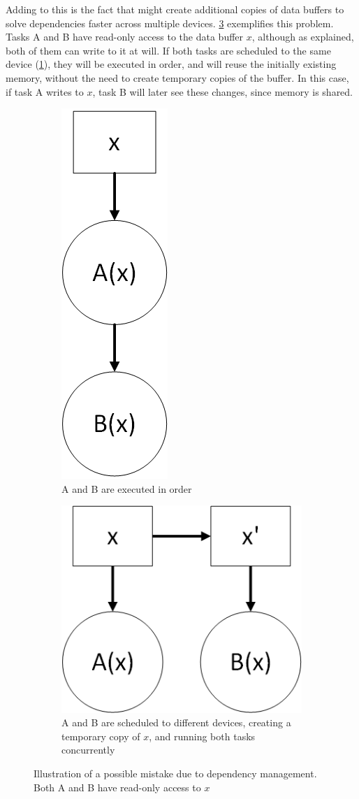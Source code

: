\documentclass[main.tex]{subfiles}
\begin{document}
Adding to this is the fact that \starpu might create additional copies of data buffers to solve dependencies faster across multiple devices. \cref{fig:deps_problem} exemplifies this problem. Tasks A and B have read-only access to the data buffer $x$, although as explained, both of them can write to it at will. If both tasks are scheduled to the same device (\cref{fig:deps_problem:a}), they will be executed in order, and \starpu will reuse the initially existing memory, without the need to create temporary copies of the buffer. In this case, if task A writes to $x$, task B will later see these changes, since memory is shared.


\begin{figure}[!htp]
  \centering
  \begin{subfigure}[b]{.5\textwidth}
    \centering
    \includegraphics[width=0.2\linewidth]{visio/starpu_dep_rw}
    \caption{A and B are executed in order \label{fig:deps_problem:a}}
  \end{subfigure}%
  \begin{subfigure}[b]{.5\textwidth}
    \centering
    \includegraphics[width=0.6\linewidth]{visio/starpu_dep_rw_caveat}
    \caption{A and B are scheduled to different devices, creating a temporary copy of $x$, and running both tasks concurrently \label{fig:deps_problem:b}}
  \end{subfigure}
  \caption{Illustration of a possible mistake due to dependency management. Both A and B have read-only access to $x$ \label{fig:deps_problem}}
\end{figure}
\end{document}

